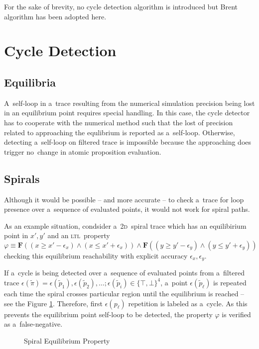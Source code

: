 \documentclass[12pt,oneside,draft]{fithesis}
\newcommand{\ltl}{\textsc{ltl}~}
\newcommand{\bF}{\mathbf{F}}
\begin{document}
For the sake of brevity, no cycle detection algorithm is introduced
but Brent algorithm\cite{wloop,brent} has been adopted here.

\section{Cycle Detection}
\subsection*{Equilibria}
A~self-loop in a~trace resulting from the numerical simulation precision
being lost in an equilibrium point requires special handling. In this
case, the cycle detector has to cooperate with the numerical method such
that the lost of precision related to approaching the equlibrium is
reported as a~self-loop. Otherwise, detecting a~self-loop on filtered
trace is impossible because the approaching does trigger no~change in
atomic proposition evaluation.

\subsection*{Spirals}
Although it would be possible -- and more accurate -- to check
a~trace for loop presence over a~sequence of evaluated points,
it would not work for spiral paths.

As an example situation, condsider
a~\textsc{2d}~spiral trace which has an equilibirium point in $x',y'$
and an \ltl property
$\varphi\equiv\bF((x\ge x'-\epsilon_x)\wedge(x\le x'+\epsilon_x))\wedge
\bF((y\ge y'-\epsilon_y)\wedge(y\le y'+\epsilon_y))$ checking this
equilibrium reachability with explicit accuracy
$\epsilon_x,\epsilon_y$.

If a~cycle is being detected over a~sequence of evaluated points
from a~filtered trace
$\epsilon(\tilde{\pi})=\epsilon(\tilde{p}_1),\epsilon(\tilde{p}_2),
\dotsc; \epsilon(\tilde{p}_i)\in\{\top,\bot\}^4$, a~point
$\epsilon(\tilde{p}_{\ell})$ is repeated each time the spiral crosses
particular region until the equilibrium is reached -- see the Figure
\ref{spiral}. Therefore, first $\epsilon(p_{\ell})$ repetition is
labeled as a~cycle. As this prevents the equilibrium point self-loop to
be detected, the property $\varphi$ is verified as a~false-negative.
\begin{figure}
%
\caption{Spiral Equilibrium Property}
\label{spiral}
\end{figure}
\end{document}
